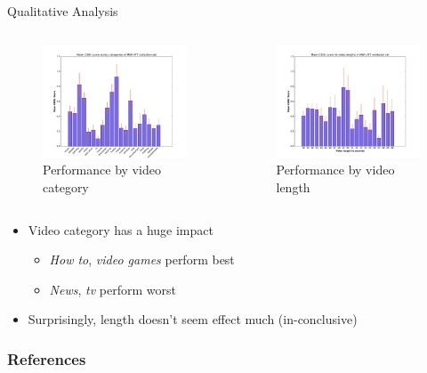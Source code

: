 \documentclass{beamer}
\begin{document}
\begin{frame}{Qualitative Analysis}
\vspace{-5mm}
\begin{columns}
  \begin{figure}[t]
    \centering
    \includegraphics[trim={2cm 0 2cm 0},clip,width=0.8\linewidth]{images/VTTCiderCateg.pdf}
    \vspace{-5mm}
    \caption{Performance by video category}%
  \end{figure}
  \begin{figure}[t]
    \centering
    \includegraphics[trim={2cm 0 2cm 0},clip, width=0.8\linewidth]{images/VTTCiderLengths.pdf}
    \vspace{-5mm}
    \caption{Performance by video length}
    \label{fig:VttLenPerf}
  \end{figure}
\end{columns}
\begin{itemize}
    \item Video category has a huge impact
       \begin{itemize}
               \item \emph{How to}, \emph{video games} perform best 
               \item \emph{News}, \emph{tv} perform worst 
       \end{itemize}
    \item Surprisingly, length doesn't seem effect much (in-conclusive) 
\end{itemize}
\end{frame}
\begin{frame}[allowframebreaks]
        \frametitle{References}
        
\end{frame}
\end{document}
